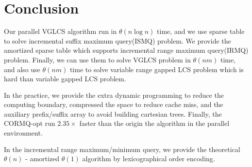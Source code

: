 \section{Conclusion}
\label{sec:Conclusion}

Our parallel VGLCS algorithm run in $\theta(n \log n)$ time, and we
use sparse table to solve incremental suffix maximum query(ISMQ)
problem.  We provide the amortized sparse table which supports
incremental range maximum query(IRMQ) problem.  Finally, we can use
them to solve VGLCS problem in $\theta(nm)$ time, and also use
$\theta(nm)$ time to solve variable range gapped LCS problem which is
hard than variable gapped LCS problem.

In the practice, we provide the extra dynamic programming to reduce
the computing boundary, compressed the space to reduce cache miss, and
the auxiliary prefix/suffix array to avoid building cartesian trees.
Finally, the CORMQ-opt run $2.35 \times$ faster than the origin
the algorithm in the parallel environment.

In the incremental range maximum/minimum query, we provide the
theoretical $\theta(n)$ - amortized $\theta(1)$ algorithm by
lexicographical order encoding.
